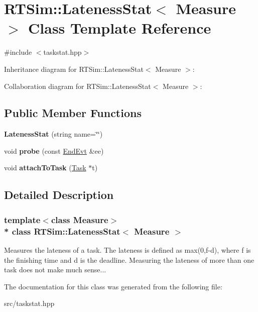 \hypertarget{classRTSim_1_1LatenessStat}{}\section{R\+T\+Sim\+:\+:Lateness\+Stat$<$ Measure $>$ Class Template Reference}
\label{classRTSim_1_1LatenessStat}


{\ttfamily \#include $<$taskstat.\+hpp$>$}



Inheritance diagram for R\+T\+Sim\+:\+:Lateness\+Stat$<$ Measure $>$\+:


Collaboration diagram for R\+T\+Sim\+:\+:Lateness\+Stat$<$ Measure $>$\+:
\subsection*{Public Member Functions}
\begin{DoxyCompactItemize}
\item 
{\bfseries Lateness\+Stat} (string name=\char`\"{}\char`\"{})\hypertarget{classRTSim_1_1LatenessStat_a659acdc4eddb9bd7e0448253e87ddbb5}{}\label{classRTSim_1_1LatenessStat_a659acdc4eddb9bd7e0448253e87ddbb5}

\item 
void {\bfseries probe} (const \hyperlink{classRTSim_1_1EndEvt}{End\+Evt} \&ee)\hypertarget{classRTSim_1_1LatenessStat_a9a13fe45292647627134f72ba9413a05}{}\label{classRTSim_1_1LatenessStat_a9a13fe45292647627134f72ba9413a05}

\item 
void {\bfseries attach\+To\+Task} (\hyperlink{classRTSim_1_1Task}{Task} $\ast$t)\hypertarget{classRTSim_1_1LatenessStat_a4996bf443482b9a12ed7753117e36f0c}{}\label{classRTSim_1_1LatenessStat_a4996bf443482b9a12ed7753117e36f0c}

\end{DoxyCompactItemize}


\subsection{Detailed Description}
\subsubsection*{template$<$class Measure$>$\\*
class R\+T\+Sim\+::\+Lateness\+Stat$<$ Measure $>$}

Measures the lateness of a task. The lateness is defined as max(0,f-\/d), where f is the finishing time and d is the deadline. Measuring the lateness of more than one task does not make much sense... 

The documentation for this class was generated from the following file\+:\begin{DoxyCompactItemize}
\item 
src/taskstat.\+hpp\end{DoxyCompactItemize}
